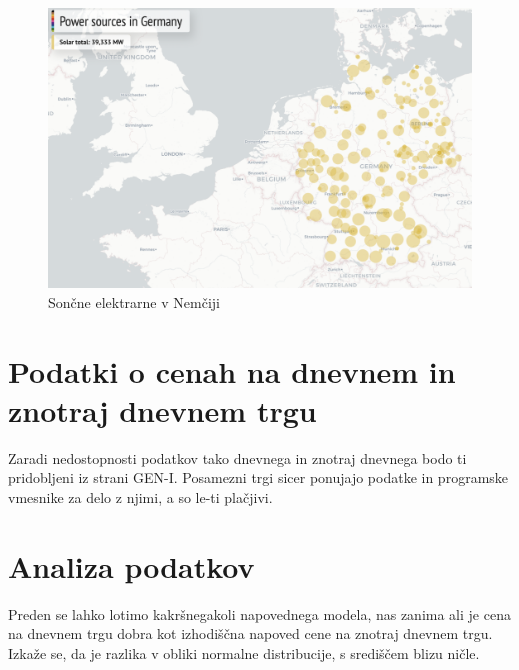 \documentclass[12pt,a4paper]{amsart}
\theoremstyle{definition} %
\theoremstyle{plain} %
\begin{document}
\begin{figure}[h]
    \centering
    \includegraphics[scale=0.35]{solar_2016.png}
    \caption{Sončne elektrarne v Nemčiji}
    \label{fig:sonce}
\end{figure}






\section{Podatki o cenah na dnevnem in znotraj dnevnem trgu}

Zaradi nedostopnosti podatkov tako dnevnega in znotraj dnevnega bodo ti pridobljeni iz strani GEN-I. Posamezni trgi sicer ponujajo podatke in programske vmesnike za delo z njimi, a so le-ti plačjivi.

\section{Analiza podatkov}

Preden se lahko lotimo kakršnegakoli napovednega modela, nas zanima ali je cena na dnevnem trgu dobra kot izhodiščna napoved cene na znotraj dnevnem trgu. Izkaže se, da je razlika v obliki normalne distribucije, s središčem blizu ničle.
\end{document}
